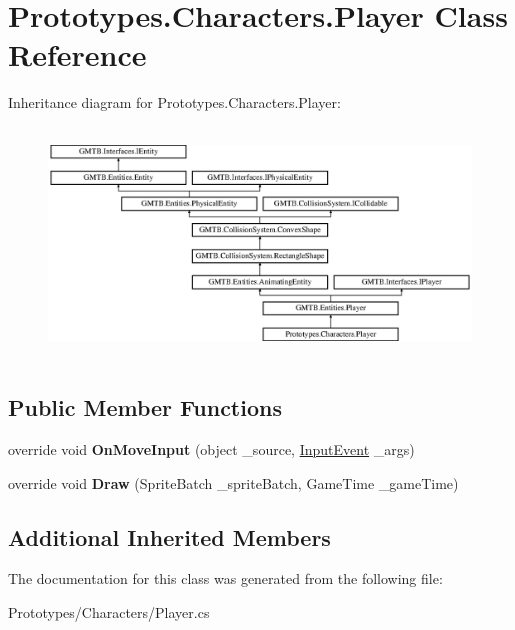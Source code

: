 \hypertarget{class_prototypes_1_1_characters_1_1_player}{}\section{Prototypes.\+Characters.\+Player Class Reference}
\label{class_prototypes_1_1_characters_1_1_player}
Inheritance diagram for Prototypes.\+Characters.\+Player\+:\begin{figure}[H]
\begin{center}
\leavevmode
\includegraphics[height=6.145404cm]{class_prototypes_1_1_characters_1_1_player}
\end{center}
\end{figure}
\subsection*{Public Member Functions}
\begin{DoxyCompactItemize}
\item 
\mbox{\label{class_prototypes_1_1_characters_1_1_player_a54f8f2b1fa94abd008dbbfe8a0164c43}} 
override void {\bfseries On\+Move\+Input} (object \+\_\+source, \mbox{\hyperlink{class_g_m_t_b_1_1_input_system_1_1_input_event}{Input\+Event}} \+\_\+args)
\item 
\mbox{\label{class_prototypes_1_1_characters_1_1_player_a83d539712dbe62f984d5bc2fd280e095}} 
override void {\bfseries Draw} (Sprite\+Batch \+\_\+sprite\+Batch, Game\+Time \+\_\+game\+Time)
\end{DoxyCompactItemize}
\subsection*{Additional Inherited Members}


The documentation for this class was generated from the following file\+:\begin{DoxyCompactItemize}
\item 
Prototypes/\+Characters/Player.\+cs\end{DoxyCompactItemize}
